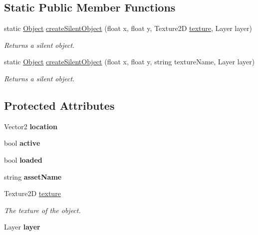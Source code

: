 \subsection*{Static Public Member Functions}
\begin{DoxyCompactItemize}
\item 
static \hyperlink{classwp__engine_1_1_object}{Object} \hyperlink{classwp__engine_1_1_object_a0f9f6f59570251ad2003ea3bfa916730}{create\-Silent\-Object} (float x, float y, Texture2\-D \hyperlink{classwp__engine_1_1_object_a5aebe29df25c51280d462cab63733c98}{texture}, Layer layer)
\begin{DoxyCompactList}\small\item\em Returns a silent object. \end{DoxyCompactList}\item 
static \hyperlink{classwp__engine_1_1_object}{Object} \hyperlink{classwp__engine_1_1_object_a969b878e10457d6ef962db2c970e32a4}{create\-Silent\-Object} (float x, float y, string texture\-Name, Layer layer)
\begin{DoxyCompactList}\small\item\em Returns a silent object. \end{DoxyCompactList}\end{DoxyCompactItemize}
\subsection*{Protected Attributes}
\begin{DoxyCompactItemize}
\item 
\hypertarget{classwp__engine_1_1_object_a7329f71d51a64edeae4eecb5e7fccb27}{Vector2 {\bfseries location}}\label{classwp__engine_1_1_object_a7329f71d51a64edeae4eecb5e7fccb27}

\item 
\hypertarget{classwp__engine_1_1_object_a54782bfa242dd87f632d4c9829181746}{bool {\bfseries active}}\label{classwp__engine_1_1_object_a54782bfa242dd87f632d4c9829181746}

\item 
\hypertarget{classwp__engine_1_1_object_a26ff3315f04a4686d08ef3ee7e227227}{bool {\bfseries loaded}}\label{classwp__engine_1_1_object_a26ff3315f04a4686d08ef3ee7e227227}

\item 
\hypertarget{classwp__engine_1_1_object_aeca7deef83d80e53be3ec06ed7b42d00}{string {\bfseries asset\-Name}}\label{classwp__engine_1_1_object_aeca7deef83d80e53be3ec06ed7b42d00}

\item 
Texture2\-D \hyperlink{classwp__engine_1_1_object_a5aebe29df25c51280d462cab63733c98}{texture}
\begin{DoxyCompactList}\small\item\em The texture of the object. \end{DoxyCompactList}\item 
\hypertarget{classwp__engine_1_1_object_a55c63fadfe9ca3ae807a4f7b0fb222e0}{Layer {\bfseries layer}}\label{classwp__engine_1_1_object_a55c63fadfe9ca3ae807a4f7b0fb222e0}

\end{DoxyCompactItemize}
